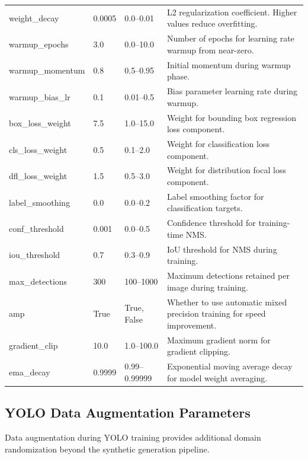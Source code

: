 \begin{longtable}{p{3.5cm}p{2cm}p{2.5cm}p{5.5cm}}
\addlinespace
weight\_decay & 0.0005 & 0.0--0.01 & L2 regularization coefficient. Higher values reduce overfitting. \\
\addlinespace
warmup\_epochs & 3.0 & 0.0--10.0 & Number of epochs for learning rate warmup from near-zero. \\
\addlinespace
warmup\_momentum & 0.8 & 0.5--0.95 & Initial momentum during warmup phase. \\
\addlinespace
warmup\_bias\_lr & 0.1 & 0.01--0.5 & Bias parameter learning rate during warmup. \\
\addlinespace
box\_loss\_weight & 7.5 & 1.0--15.0 & Weight for bounding box regression loss component. \\
\addlinespace
cls\_loss\_weight & 0.5 & 0.1--2.0 & Weight for classification loss component. \\
\addlinespace
dfl\_loss\_weight & 1.5 & 0.5--3.0 & Weight for distribution focal loss component. \\
\addlinespace
label\_smoothing & 0.0 & 0.0--0.2 & Label smoothing factor for classification targets. \\
\addlinespace
conf\_threshold & 0.001 & 0.0--0.5 & Confidence threshold for training-time NMS. \\
\addlinespace
iou\_threshold & 0.7 & 0.3--0.9 & IoU threshold for NMS during training. \\
\addlinespace
max\_detections & 300 & 100--1000 & Maximum detections retained per image during training. \\
\addlinespace
amp & True & True, False & Whether to use automatic mixed precision training for speed improvement. \\
\addlinespace
gradient\_clip & 10.0 & 1.0--100.0 & Maximum gradient norm for gradient clipping. \\
\addlinespace
ema\_decay & 0.9999 & 0.99--0.99999 & Exponential moving average decay for model weight averaging. \\
\end{longtable}

\subsection{YOLO Data Augmentation Parameters}

Data augmentation during YOLO training provides additional domain randomization beyond the synthetic generation pipeline.

